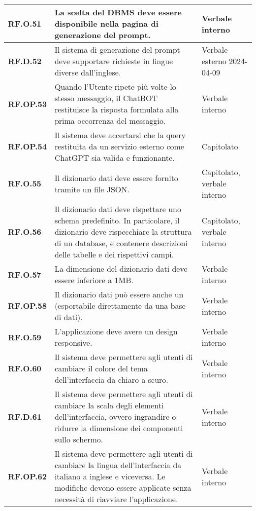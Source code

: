 \begin{adjustwidth}{-0.5cm}{-0.5cm}
\begin{longtable}{|P{3cm}|P{6,5cm}|>{\arraybackslash}P{4cm}|}
    \hline
    \textbf{RF.O.51} & La scelta del DBMS deve essere disponibile nella pagina di generazione del prompt. & Verbale interno \\
    \hline
    \textbf{RF.D.52} & Il sistema di generazione del prompt deve supportare richieste in lingue diverse dall'inglese. & Verbale esterno 2024-04-09 \\
    \hline
    \textbf{RF.OP.53} & Quando l'Utente ripete più volte lo stesso messaggio, il ChatBOT restituisce la risposta formulata alla prima occorrenza del messaggio. & Verbale interno \\
    \hline
    \textbf{RF.OP.54} & Il sistema deve accertarsi che la query  restituita da un servizio esterno come ChatGPT sia valida e funzionante. & Capitolato \\
    \hline
    \textbf{RF.O.55} & Il dizionario dati deve essere fornito tramite un file JSON. & Capitolato, verbale interno \\
    \hline
    \textbf{RF.O.56} & Il dizionario dati deve rispettare uno schema predefinito. In particolare, il dizionario deve rispecchiare la struttura di un database, e contenere descrizioni delle tabelle e dei rispettivi campi. & Capitolato, verbale interno \\
    \hline
    \textbf{RF.O.57} & La dimensione del dizionario dati deve essere inferiore a 1MB. & Verbale interno \\
    \hline
    \textbf{RF.OP.58} & Il dizionario dati può essere anche un  (esportabile direttamente da una base di dati). & Verbale interno \\
    \hline
    \textbf{RF.O.59} & L'applicazione deve avere un design responsive. & Verbale interno \\
    \hline
    \textbf{RF.O.60} & Il sistema deve permettere agli utenti di cambiare il colore del tema dell'interfaccia da chiaro a scuro. & Verbale interno \\
    \hline
    \textbf{RF.D.61} & Il sistema deve permettere agli utenti di cambiare la scala degli elementi dell'interfaccia, ovvero ingrandire o ridurre la dimensione dei componenti sullo schermo. & Verbale interno \\
    \hline
    \textbf{RF.OP.62} & Il sistema deve permettere agli utenti di cambiare la lingua dell'interfaccia da italiano a inglese e viceversa. Le modifiche devono essere applicate senza necessità di riavviare l'applicazione. & Verbale interno \\
  \end{longtable}
\end{adjustwidth}
\egroup

